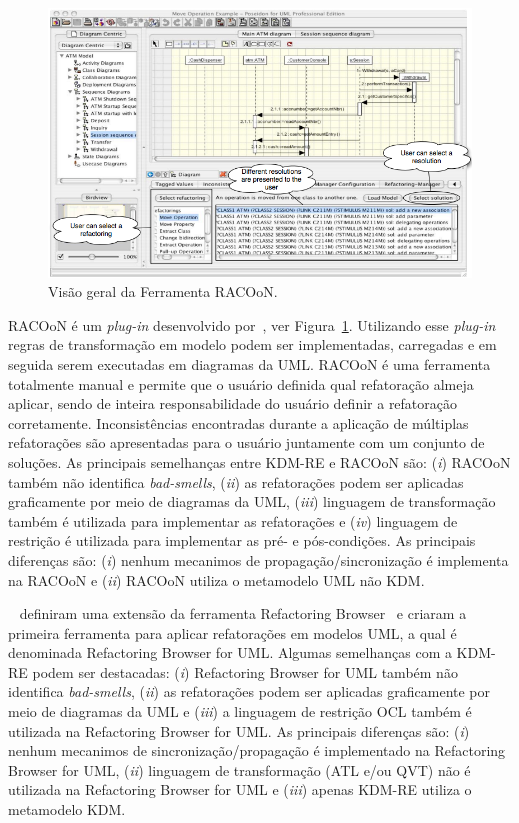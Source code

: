 \begin{figure}[h]
	\centering
	\caption{Visão geral da Ferramenta RACOoN.}
	\label{fig:racoon}
	\includegraphics[scale=0.52]{images/fig_racoon}
\end{figure}

RACOoN é um \textit{plug-in} desenvolvido por~, ver Figura~\ref{fig:racoon}. Utilizando esse \textit{plug-in} regras de transformação em modelo podem ser implementadas, carregadas e em seguida serem executadas em diagramas da UML. RACOoN é uma ferramenta totalmente manual e permite que o usuário definida qual refatoração almeja aplicar, sendo de inteira responsabilidade do usuário definir a refatoração corretamente. Inconsistências encontradas durante a aplicação de múltiplas refatorações são apresentadas para o usuário juntamente com um conjunto de soluções. As principais semelhanças entre KDM-RE e RACOoN são: (\textit{i}) RACOoN também não identifica \textit{bad-smells}, (\textit{ii}) as refatorações podem ser aplicadas graficamente por meio de diagramas da UML, (\textit{iii}) linguagem de transformação também é utilizada para implementar as refatorações e (\textit{iv}) linguagem de restrição é utilizada para implementar as pré- e pós-condições. As principais diferenças são: (\textit{i}) nenhum mecanimos de propagação/sincronização é implementa na RACOoN e (\textit{ii}) RACOoN utiliza o metamodelo UML não KDM.



~ definiram uma extensão da ferramenta Refactoring Browser~\cite{roberts1997refactoring} e criaram a primeira ferramenta para aplicar refatorações em modelos UML, a qual é denominada Refactoring Browser for UML. Algumas semelhanças com a KDM-RE podem ser destacadas: (\textit{i}) Refactoring Browser for UML também não identifica \textit{bad-smells}, (\textit{ii}) as refatorações podem ser aplicadas graficamente por meio de diagramas da UML e (\textit{iii}) a linguagem de restrição OCL também é utilizada na Refactoring Browser for UML. As principais diferenças são: (\textit{i}) nenhum mecanimos de sincronização/propagação é implementado na Refactoring Browser for UML, (\textit{ii}) linguagem de transformação (ATL e/ou QVT) não é utilizada na Refactoring Browser for UML e (\textit{iii}) apenas KDM-RE utiliza o metamodelo KDM.


